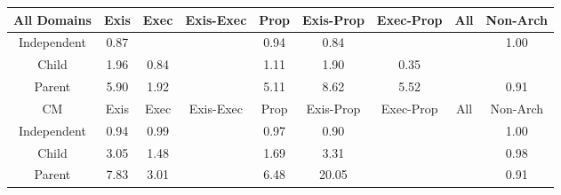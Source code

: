 \begin{tabular}{|c||c|c|c|c|c|c|c|c|}
\hline
All Domains & Exis & Exec & Exis-Exec & Prop & Exis-Prop & Exec-Prop & All & Non-Arch \\ 
\hline
Independent & \cellcolor[rgb]{0.8861987695161551,0.7273408423764673,0.39778551821507807} 0.87 &  &  & \cellcolor[rgb]{0.8991933054520914,0.7888483124732324,0.4099137517552852} 0.94 & \cellcolor[rgb]{0.8807132301658733,0.7013759561184669,0.3926656814881484} 0.84 &  &  & \cellcolor[rgb]{0.9099767713937363,0.8399889969759803,0.42} 1.00 \\ 
\hline
Child & \cellcolor[rgb]{0.8908499705352947,0.8309289334114554,0.42} 1.96 & \cellcolor[rgb]{0.8793886953755028,0.695106491444046,0.39142944901713583} 0.84 &  & \cellcolor[rgb]{0.9078734157630732,0.8389926706246136,0.42} 1.11 & \cellcolor[rgb]{0.8919769394315149,0.8314627607833491,0.42} 1.90 & \cellcolor[rgb]{0.7886801238925196,0.2657525864245932,0.3067681156330184} 0.35 &  &  \\ 
\hline
Parent & \cellcolor[rgb]{0.8122704153200693,0.7937070388358224,0.42} 5.90 & \cellcolor[rgb]{0.891697211491683,0.8313302580750077,0.42} 1.92 &  & \cellcolor[rgb]{0.8279964387182037,0.8011562078138859,0.42} 5.11 & \cellcolor[rgb]{0.7580040083340689,0.7680018986845589,0.42} 8.62 & \cellcolor[rgb]{0.8198528986520544,0.7972987414667626,0.42} 5.52 &  & \cellcolor[rgb]{0.8929252305947922,0.7591794248153497,0.4040635485551394} 0.91 \\ 
\hline
\hline
CM & Exis & Exec & Exis-Exec & Prop & Exis-Prop & Exec-Prop & All & Non-Arch \\ 
\hline
Independent & \cellcolor[rgb]{0.8992327171458545,0.7890348611570444,0.40995053600279746} 0.94 & \cellcolor[rgb]{0.9072254775350068,0.8268672603323657,0.4174104456993397} 0.99 &  & \cellcolor[rgb]{0.9043288907224717,0.8131567494196995,0.41470696467430695} 0.97 & \cellcolor[rgb]{0.8905900909838588,0.7481264306569313,0.40188408491826816} 0.90 &  &  & \cellcolor[rgb]{0.9099875309619849,0.8399940936135718,0.42} 1.00 \\ 
\hline
Child & \cellcolor[rgb]{0.8690972558773331,0.8206250159418945,0.42} 3.05 & \cellcolor[rgb]{0.9004817030594731,0.8354913330281715,0.42} 1.48 &  & \cellcolor[rgb]{0.8961927512323714,0.8334597242679653,0.41999999999999993} 1.69 & \cellcolor[rgb]{0.8639695319616767,0.81819609408711,0.42} 3.31 &  &  & \cellcolor[rgb]{0.9063128693273227,0.8225475814826602,0.4165586780388344} 0.98 \\ 
\hline
Parent & \cellcolor[rgb]{0.7737248395697446,0.7754486082172474,0.42} 7.83 & \cellcolor[rgb]{0.8699308237785668,0.8210198638951105,0.41999999999999993} 3.01 &  & \cellcolor[rgb]{0.8007103402973728,0.7882312138250713,0.42000000000000004} 6.48 & \cellcolor[rgb]{0.53,0.66,0.42} 20.05 &  &  & \cellcolor[rgb]{0.8939458332128357,0.764010277207422,0.4050161109986466} 0.91 \\ 

\end{tabular}

